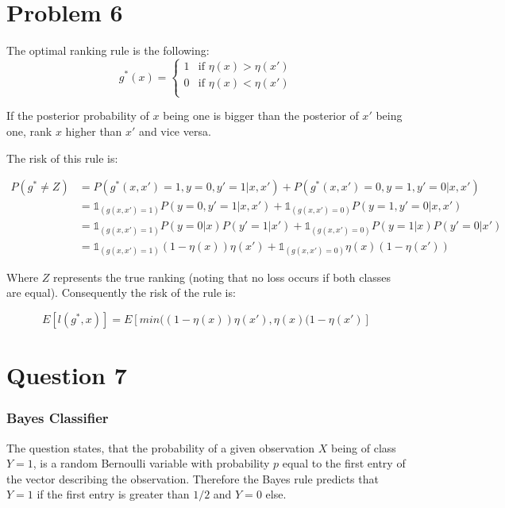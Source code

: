 \documentclass[a4paper, 11pt]{article} %
\begin{document}
\section*{Problem 6} 

The optimal ranking rule is the following:
$$
g^*(x) = \left\{ \begin{array}{ ll} {1} & {\text {if } \eta(x) > \eta(x')} \\
{0} & {\text{if } \eta(x) < \eta(x') } \\
\end{array} \right. $$

If the posterior probability of $x$ being one is bigger than the posterior of $x'$ being one, rank $x$ higher than $x'$ and vice versa.

The risk of this rule is:

\begin{align*}
P(g^* \neq Z) &= P(g^*(x,x') = 1, y = 0, y'=1 | x, x') + P(g^*(x,x') = 0, y = 1, y'=0 | x, x') \\
&= \mathbb{1}_{(g(x,x') = 1)} P(y = 0, y'=1 | x, x') + \mathbb{1}_{(g(x,x') = 0)} P(y = 1, y'=0 | x, x') \\
&= \mathbb{1}_{(g(x,x') = 1)} P(y = 0| x)P(y'=1 |x') + \mathbb{1}_{(g(x,x') = 0)} P(y = 1| x)P(y'=0 | x') \\
&= \mathbb{1}_{(g(x,x') = 1)} (1-\eta(x))\eta(x') + \mathbb{1}_{(g(x,x') = 0)} \eta(x) (1-\eta(x'))
\end{align*}

Where $Z$ represents the true ranking (noting that no loss occurs if both classes are equal). Consequently the risk of the rule is:

$$E\left[ l(g^*,x) \right] = E\left[ min((1-\eta(x))\eta(x'),\eta(x) (1-\eta(x')\right]$$


\section*{Question 7}

\subsubsection*{Bayes Classifier}

The question states, that the probability of a given observation $X$ being of class $Y=1$, is a random Bernoulli variable with probability $p$ equal to the first entry of the vector describing the observation. Therefore the Bayes rule predicts that $Y =1$ if the first entry is greater than $1/2$ and $Y=0$ else. 
\end{document}
